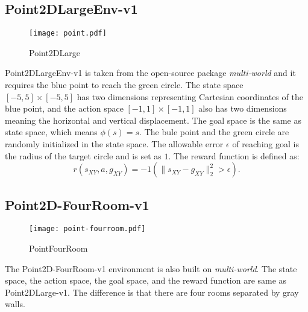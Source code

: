 \documentclass{article}
\begin{document}
\subsection{Point2DLargeEnv-v1}
\begin{wrapfigure}{r}{2.3cm}
\centering
  \vspace{-25pt}    %
  \texttt{[image: point.pdf]}\\
  \vspace{-0pt}    %
  \caption*{Point2DLarge}
  \vspace{-8pt}    %
\end{wrapfigure}
Point2DLargeEnv-v1 is taken from the open-source package \emph{multi-world} and it requires the blue point to reach the green circle. The state space $[-5,5]\times[-5,5]$ has two dimensions representing Cartesian coordinates of the blue point, and the action space $[-1,1]\times[-1,1]$ also has two dimensions meaning the horizontal and vertical displacement. The goal space is the same as state space, which means $\phi(s)=s$. The bule point and the green circle are randomly initialized in the state space. The allowable error $\epsilon$ of reaching goal is the radius of the target circle and is set as $1$. The reward function is defined as:
\begin{equation*}
    r(s_{XY},a,g_{XY}) = - 1(\|s_{XY}-g_{XY} \|_2^2 > \epsilon) .
\end{equation*}



\subsection{Point2D-FourRoom-v1}
\begin{wrapfigure}{r}{2.3cm}
\centering
  \vspace{-40pt}    %
  \texttt{[image: point-fourroom.pdf]}\\
  \vspace{-0pt}    %
  \caption*{PointFourRoom}
  \vspace{-0pt}    %
\end{wrapfigure}
The Point2D-FourRoom-v1 environment is also built on \emph{multi-world}. The state space, the action space, the goal space, and the reward function are same as Point2DLarge-v1. The difference is that there are four rooms separated by gray walls.
\end{document}
